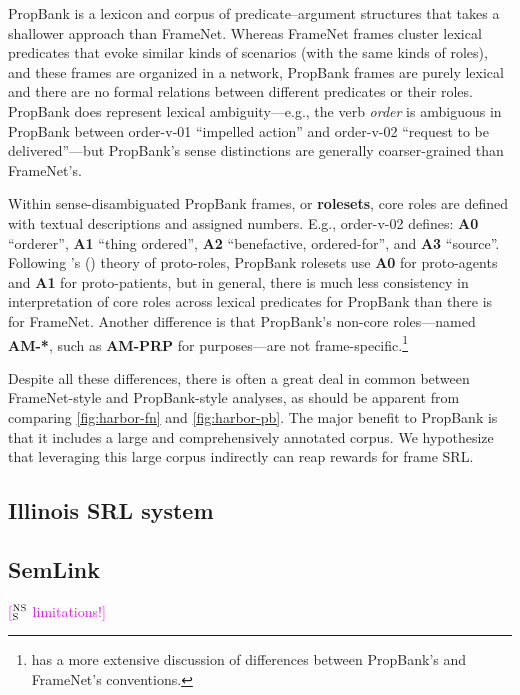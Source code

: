 \documentclass[11pt,a4paper]{article}
\newcommand{\ensuretext}[1]{#1}
\newcommand{\nssmarker}{\ensuretext{\textcolor{magenta}{\ensuremath{^{\textsc{NS}}_{\textsc{S}}}}}}
\newcommand{\arkcomment}[3]{\ensuretext{\textcolor{#3}{[#1 #2]}}}
\newcommand{\nss}[1]{\arkcomment{\nssmarker}{#1}{magenta}}
\newcommand{\citeposs}[2][]{\citeauthor{#2}'s (\citeyear[#1]{#2})}
\newcommand{\pbf}[1]{\mbox{\textsf{#1}}} %
\newcommand{\pbr}[1]{\textbf{\textsf{#1}}} %
\begin{document}
PropBank \citep[PB;][]{palmer-05} is a lexicon and corpus of predicate--argument structures
that takes a shallower approach than FrameNet. Whereas FrameNet frames cluster 
lexical predicates that evoke similar kinds of scenarios (with the same kinds of roles), 
and these frames are organized in a network, 
PropBank frames are purely lexical and there are no formal relations between different predicates 
or their roles.
PropBank does represent lexical ambiguity---e.g., the verb \textit{order} is ambiguous 
in PropBank between \pbf{order-v-01} ``impelled action'' and \pbf{order-v-02} ``request to be delivered''---but
PropBank's sense distinctions are generally coarser-grained than FrameNet's.

Within sense-disambiguated PropBank frames, or \textbf{rolesets}, 
core roles are defined with textual descriptions and assigned numbers. 
E.g., \pbf{order-v-02} defines: \pbr{A0} ``orderer'', 
\pbr{A1} ``thing ordered'', \pbr{A2} ``benefactive, ordered-for'', 
and \pbr{A3} ``source''.
Following \citeposs{dowty-91} theory of proto-roles, PropBank rolesets use \pbr{A0} for proto-agents 
and \pbr{A1} for proto-patients, but in general, there is much less consistency 
in interpretation of core roles across lexical predicates for PropBank than there is for FrameNet.
Another difference is that PropBank's non-core roles---named \pbr{AM-*}, 
such as \pbr{AM-PRP} for purposes---are not frame-specific.\footnote{ 
has a more extensive discussion of differences between PropBank's and FrameNet's conventions.}

Despite all these differences, there is often a great deal in common between 
FrameNet-style and PropBank-style analyses, as should be apparent from comparing 
\cref{fig:harbor-fn} and \cref{fig:harbor-pb}. 
The major benefit to PropBank is that it includes a large and comprehensively annotated corpus.
We hypothesize that leveraging this large corpus indirectly 
can reap rewards for frame SRL. 

\subsection{Illinois SRL system}\label{sec:pbsrl}

\subsection{SemLink}\label{sec:semlink}

\nss{limitations!}
\end{document}
